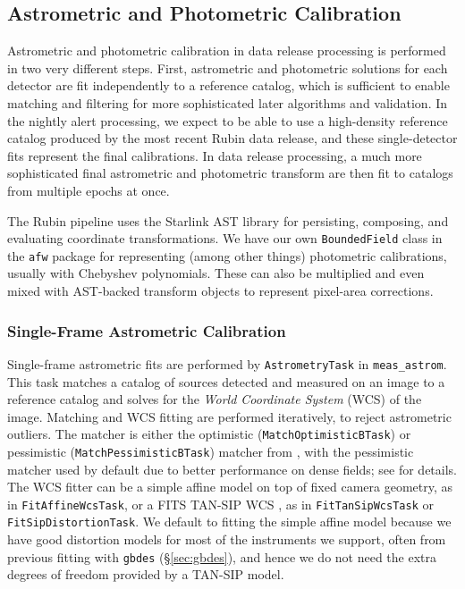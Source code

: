 \subsection{Astrometric and Photometric Calibration}
\label{sec:calibration}

Astrometric and photometric calibration in data release processing is performed in two very different steps.
First, astrometric and photometric solutions for each detector are fit independently to a reference catalog, which is sufficient to enable matching and filtering for more sophisticated later algorithms and validation.
In the nightly alert processing, we expect to be able to use a high-density reference catalog produced by the most recent Rubin data release, and these single-detector fits represent the final calibrations.
In data release processing, a much more sophisticated final astrometric and photometric transform are then fit to catalogs from multiple epochs at once.

The Rubin pipeline uses the Starlink AST library \citep{2016A&C....15...33B} for persisting, composing, and evaluating coordinate transformations.
We have our own \texttt{Bounded\-Field} class in the \texttt{afw} package for representing (among other things) photometric calibrations, usually with Chebyshev polynomials.
These can also be multiplied and even mixed with AST-backed transform objects to represent pixel-area corrections.

\subsubsection{Single-Frame Astrometric Calibration}
\label{sec:astrometryTask}

Single-frame astrometric fits are performed by \texttt{Astrometry\-Task} in \texttt{meas\_astrom}.
This task matches a catalog of sources detected and measured on an image to a reference catalog and solves for the \textit{World Coordinate System} (WCS) of the image.
Matching and WCS fitting are performed iteratively, to reject astrometric outliers.
The matcher is either the optimistic (\texttt{Match\-Optimistic\-BTask}) or pessimistic (\texttt{Match\-Pessimistic\-BTask}) matcher from \citet{2007PASA...24..189T}, with the pessimistic matcher used by default due to better performance on dense fields; see \citep{DMTN-031} for details.
The WCS fitter can be a simple affine model on top of fixed camera geometry, as in \texttt{Fit\-Affine\-Wcs\-Task}, or a FITS TAN-SIP WCS \citep{2005ASPC..347..491S}, as in \texttt{Fit\-Tan\-Sip\-Wcs\-Task} or \texttt{Fit\-Sip\-Distortion\-Task}.
We default to fitting the simple affine model because we have good distortion models for most of the instruments we support, often from previous fitting with \texttt{gbdes} (\S\ref{sec:gbdes}), and hence we do not need the extra degrees of freedom provided by a TAN-SIP model.

